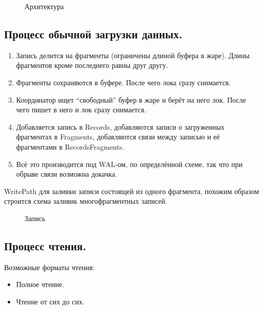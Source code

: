 \begin{figure}
\centering
\pandocbounded{}
\caption{Архитектура}
\end{figure}

\subsection{Процесс обычной загрузки
данных.}\label{ux43fux440ux43eux446ux435ux441ux441-ux43eux431ux44bux447ux43dux43eux439-ux437ux430ux433ux440ux443ux437ux43aux438-ux434ux430ux43dux43dux44bux445.}

\begin{enumerate}
\def\labelenumi{\arabic{enumi}.}
\tightlist
\item
  Запись делится на фрагменты (ограничены длиной буфера в жаре). Длины
  фрагментов кроме последнего равны друг другу.
\item
  Фрагменты сохраняются в буфере. После чего лока сразу снимается.
\item
  Координатор ищет ``свободный'' буфер в жаре и берёт на него лок. После
  чего пишет в него и лок сразу снимается.
\item
  Добавляется запись в Records, добавляются записи о загруженных
  фрагментах в Fragments, добавляются связи между записью и её
  фрагментами в RecordsFragments.
\item
  Всё это производится под WAL-ом, по определённой схеме, так что при
  обрыве связи возможна докачка.
\end{enumerate}

WritePath для заливки записи состоящей из одного фрагмента, похожим
образом строится схема заливик многофрагментных записей.

\begin{figure}
\centering
\pandocbounded{}
\caption{Запись}
\end{figure}

\subsection{Процесс
чтения.}\label{ux43fux440ux43eux446ux435ux441ux441-ux447ux442ux435ux43dux438ux44f.}

Возможные форматы чтения:

\begin{itemize}
\tightlist
\item
  Полное чтение.
\item
  Чтение от сих до сих.
\end{itemize}

